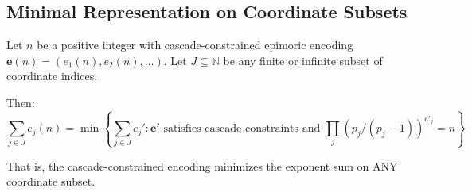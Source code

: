 \subsection{Minimal Representation on Coordinate Subsets}
\label{subsec:minimal-representation-subsets}

\begin{theorem}
\label{thm:minimal-on-subsets}

Let $n$ be a positive integer with cascade-constrained epimoric encoding $\mathbf{e}(n) = (e_1(n), e_2(n), \ldots)$. Let $J \subseteq \mathbb{N}$ be any finite or infinite subset of coordinate indices.

Then:
\begin{equation}
\sum_{j \in J} e_j(n) = \min \left\{\sum_{j \in J} e_j' : \mathbf{e}' \text{ satisfies cascade constraints and } \prod_j (p_j/(p_j-1))^{e'_j} = n\right\}
\end{equation}

That is, the cascade-constrained encoding minimizes the exponent sum on ANY coordinate subset.

\end{theorem}

